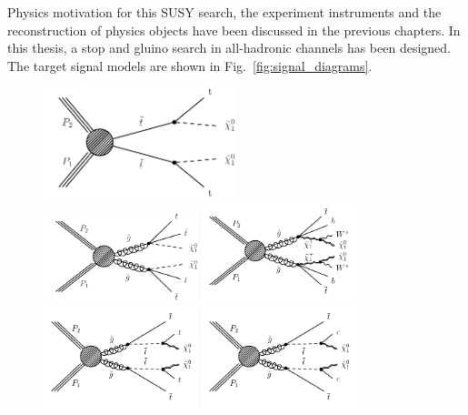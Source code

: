 Physics motivation for this SUSY search, the experiment instruments and the reconstruction of physics objects have been discussed in the previous chapters. In this thesis, a stop and gluino search in all-hadronic channels has been designed. The target signal models are shown in Fig.~\ref{fig:signal_diagrams}.

\begin{figure}[ht!]
\begin{centering}
\includegraphics[width=0.50\textwidth]{sections/mc4/Introduction/figures/T2tt.pdf}\\
\includegraphics[width=0.40\textwidth]{sections/mc4/Introduction/figures/T1tttt_feynman.pdf}
\includegraphics[width=0.40\textwidth]{sections/mc4/Introduction/figures/T1ttbb.pdf}\\
\includegraphics[width=0.40\textwidth]{sections/mc4/Introduction/figures/T5tttt.pdf}
\includegraphics[width=0.40\textwidth]{sections/mc4/Introduction/figures/T5ttcc.pdf}\\

\end{centering}
\end{figure}
